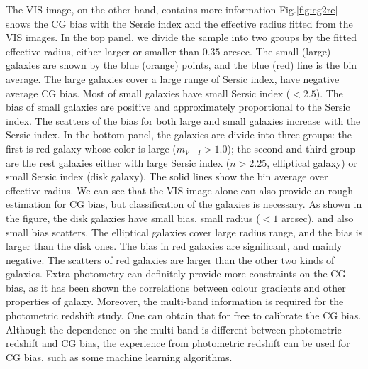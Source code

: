 \documentclass[useAMS,usenatbib]{mn2e}
\newcommand{\be}{\begin{equation}}
\newcommand{\ee}{\end{equation}}
\def\elabel#1{\label{eq:#1}}
\begin{document}
The VIS image, on the other hand, contains more information
Fig.\ref{fig:cg2re} shows the CG bias with the Sersic index
and the effective radius fitted from the VIS images. In the top panel,
we divide the sample into two groups by the fitted effective radius,
either larger or smaller than $0.35$ arcsec. The small (large)
galaxies are shown by the blue (orange) points, and the blue (red)
line is the bin average.  The large galaxies cover a large range of
Sersic index, have negative average CG bias. Most of small galaxies
have small Sersic index ($<2.5$). The bias of small galaxies are
positive and approximately proportional to the Sersic index. The
scatters of the bias for both large and small galaxies increase with
the Sersic index.
%
In the bottom panel, the galaxies are divide into three groups: the
first is red galaxy whose color is large ($m_{V-I}>1.0$); the second
and third group are the rest galaxies either with large Sersic index
($n>2.25$, elliptical galaxy) or small Sersic index (disk galaxy). The
solid lines show the bin average over effective radius.
%
%
%
We can see that the VIS image alone can also provide an rough
estimation for CG bias, but classification of the galaxies is
necessary. As shown in the figure, the disk galaxies have small bias,
small radius ($<1$ arcsec), and also small bias scatters. The
elliptical galaxies cover large radius range, and the bias is larger
than the disk ones. The bias in red galaxies are significant, and
mainly negative. The scatters of red galaxies are larger than the
other two kinds of galaxies.
%
Extra photometry can definitely provide more constraints on the CG
bias, as it has been shown the correlations between colour gradients and
other properties of galaxy. Moreover, the multi-band
information is required for the photometric redshift study. One can
obtain that for free to calibrate the CG bias. Although the dependence
on the multi-band is different between photometric redshift and CG
bias, the experience from photometric redshift can be used for CG
bias, such as some machine learning algorithms.
\end{document}
